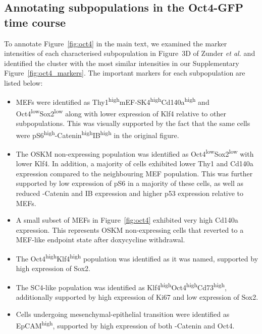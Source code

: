 \documentclass{article}
\begin{document}
\newcommand{\hi}{\textsuperscript{high}}
\newcommand{\lo}{\textsuperscript{low}}

\subsection{Annotating subpopulations in the Oct4-GFP time course}
To annotate Figure~\ref{fig:oct4} in the main text, we examined the marker intensities of each characterised subpopulation in Figure~3D of Zunder \emph{et al.} \cite{zunder2015continuous} and identified the cluster with the most similar intensities in our Supplementary Figure~\ref{fig:oct4_markers}.
The important markers for each subpopulation are listed below:
\begin{itemize}
    \item MEFs were identified as Thy1\hi{}mEF-SK4\hi{}Cd140a\hi{} and Oct4\lo{}Sox2\lo{} along with lower expression of Klf4 relative to other subpopulations.
        This was visually supported by the fact that the same cells were pS6\hi{}\textbeta-Catenin\hi{}I\textkappa{}B\textalpha\hi{} in the original figure.
    \item The OSKM non-expressing population was identified as Oct4\lo{}Sox2\lo{} with lower Klf4.
        In addition, a majority of cells exhibited lower Thy1 and Cd140a expression compared to the neighbouring MEF population.
        This was further supported by low expression of pS6 in a majority of these cells, as well as reduced \textbeta-Catenin and I\textkappa{}B\textalpha{} expression and higher p53 expression relative to MEFs.
    \item A small subset of MEFs in Figure~\ref{fig:oct4} exhibited very high Cd140a expression.
This represents OSKM non-expressing cells that reverted to a MEF-like endpoint state after doxycycline withdrawal.
    \item The Oct4\hi{}Klf4\hi{} population was identified as it was named, supported by high expression of Sox2.
    \item The SC4-like population was identified as Klf4\hi{}Oct4\hi{}Cd73\hi{}, additionally supported by high expression of Ki67 and low expression of Sox2.
    \item Cells undergoing mesenchymal-epithelial transition were identified as EpCAM\hi{}, supported by high expression of both \textbeta-Catenin and Oct4.

\end{itemize}
\end{document}
